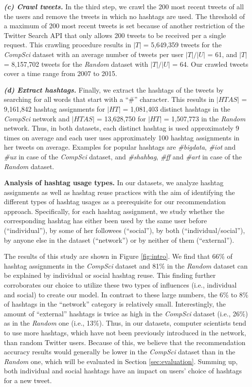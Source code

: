 \documentclass{sig-alternate-05-2015}
\newcommand{\para}[1]{\vspace{2mm}\noindent\textbf{#1}}
\newcommand{\subpara}[1]{\textit{\textbf{#1}}}
\begin{document}
\subpara{(c) Crawl tweets.} In the third step, we crawl the 200 most recent tweets of all the users and remove the tweets in which no hashtags are used. The threshold of a maximum of 200 most recent tweets is set because of another restriction of the Twitter Search API that only allows 200 tweets to be received per a single request. This crawling procedure results in $|T|$ = 5,649,359 tweets for the \textit{CompSci}{} dataset with an average number of tweets per user $|T| / |U|$ = 61, and $|T|$ = 8,157,702 tweets for the \textit{Random}{} dataset with $|T| / |U|$ = 64. Our crawled tweets cover a time range from 2007 to 2015.

\subpara{(d) Extract hashtags.} Finally, we extract the hashtags of the tweets by searching for all words that start with a ``\#'' character. This results in $|HTAS|$ = 9,161,842 hashtag assignments for $|HT|$ = 1,081,403 distinct hashtags in the \textit{CompSci}{} network and $|HTAS|$ = 13,628,750  for $|HT|$ = 1,507,773 in the \textit{Random}{} network. Thus, in both datasets, each distinct hashtag is used approximately 9 times on average and each user uses approximately 100 hashtag assignments in her tweets on average. Examples for popular hashtags are \textit{\#bigdata}, \textit{\#iot} and \textit{\#ux} in case of the \textit{CompSci}{} dataset, and \textit{\#shahbag}, \textit{\#ff} and \textit{\#art} in case of the \textit{Random}{} dataset.

\para{Analysis of hashtag usage types.} In our datasets, we analyze hashtag assignments as well as hashtag reuse practices with the aim of identifying the different types of hashtag usages as a prerequisite for our recommendation approach. Specifically, for each hashtag assignment, we study whether the corresponding hashtag has either been used by the same user before (``individual''), by some of her followees (``social''), by both (``individual/social''), by anyone else in the dataset (``network'') or by neither of them (``external'').

The results of this study are shown in Figure \ref{fig:intro}. We find that 66\% of hashtag assignments in the \textit{CompSci}{} dataset and 81\% in the \textit{Random}{} dataset can be explained by individual or social hashtag reuse. This finding further corroborates our choice to utilize these two types of influences (i.e., individual and social) to create our model. In contrast to these large numbers, the 6\% to 8\% of hashtags in the ``network'' category is relatively small. Interestingly, the amount of ``external'' hashtags is twice as high in the \textit{CompSci}{} dataset (i.e., 26\%) as in the \textit{Random}{} one (i.e., 13\%). Thus, in our datasets, computer scientists tend to use more hashtags, which have not been previously introduced in the network, than random Twitter users. Because of this, we believe that the recommendation accuracy results would generally be lower in the \textit{CompSci}{} dataset than in the \textit{Random}{} one, which will be evaluated in Section \ref{sec:evaluation}. Summing up, both individual and social hashtags have an impact on users' choice of hashtags for a new tweet.
%
\end{document}
